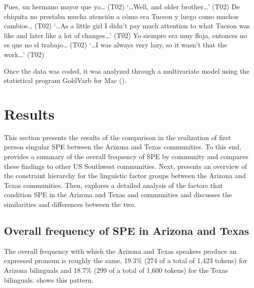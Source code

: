 \documentclass[output=paper]{langscibook}
\begin{document}
\ea\label{ex:aztx:12}Pues, {{} } un hermano mayor que yo… (T02)
 \glt ‘…Well, {{} } and older brother…’ (T02)
\ex\label{ex:aztx:13}De chiquita no prestaba mucha atención a cómo era Tucson y luego como {{}  } muchos cambios… (T02)
 \glt ‘…As a little girl I didn’t pay much attention to what Tucson was like and later like {{}  } a lot of changes…’ (T02)
\ex\label{ex:aztx:14}Yo siempre era muy floja, entonces no es que no {{}  } el trabajo… (T02)
 \glt ‘…I was always very lazy, so it wasn’t that {{}  } the work…’ (T02)
\z 


Once the data was coded, it was analyzed through a multivariate model using the statistical program GoldVarb for Mac (\citealt{SankoffSmith2018}).


\section{Results}\label{sec:aztx:3}

This section presents the results of the comparison in the realization of first person singular SPE between the Arizona and Texas communities. To this end,  provides a summary of the overall frequency of SPE by community and compares these findings to other US Southwest communities. Next,  presents an overview of the constraint hierarchy for the linguistic factor groups between the Arizona and Texas communities. Then,  explores a detailed analysis of the factors that condition SPE in the Arizona and Texas and communities and discusses the similarities and differences between the two.



\subsection{Overall frequency of SPE in Arizona and Texas}\label{sec:aztx:3.1}\largerpage


The overall frequency with which the Arizona and Texas speakers produce an expressed pronoun is roughly the same, 19.3\% (274 of a total of 1,423 tokens) for Arizona bilinguals and 18.7\% (299 of a total of 1,600 tokens) for the Texas bilinguals.  shows this pattern. 
\end{document}
